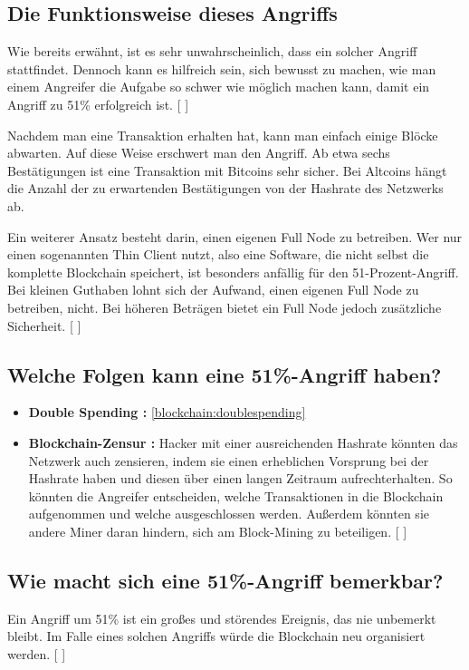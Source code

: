 \documentclass[ngerman]{scrreprt}
\begin{document}
\subsection{Die Funktionsweise dieses Angriffs}
Wie bereits erwähnt, ist es sehr unwahrscheinlich, dass ein solcher Angriff stattfindet. Dennoch kann es hilfreich sein, sich bewusst zu machen, wie man einem Angreifer die Aufgabe so schwer wie möglich machen kann, damit ein Angriff zu 51\% erfolgreich ist. [ \cite{51attack} ]

Nachdem man eine Transaktion erhalten hat, kann man einfach einige Blöcke abwarten. Auf diese Weise erschwert man den Angriff. Ab etwa sechs Bestätigungen ist eine Transaktion mit Bitcoins sehr sicher. Bei Altcoins hängt die Anzahl der zu erwartenden Bestätigungen von der Hashrate des Netzwerks ab.   

Ein weiterer Ansatz besteht darin, einen eigenen Full Node zu betreiben. Wer nur einen sogenannten Thin Client nutzt, also eine Software, die nicht selbst die komplette Blockchain speichert, ist besonders anfällig für den 51-Prozent-Angriff. Bei kleinen Guthaben lohnt sich der Aufwand, einen eigenen Full Node zu betreiben, nicht. Bei höheren Beträgen bietet ein Full Node jedoch zusätzliche Sicherheit. [ \cite{51attack} ]

\subsection{Welche Folgen kann eine 51\%-Angriff haben? }
\begin{itemize}
	\item \textbf{Double Spending : } \cref{blockchain:doublespending}
	\item \textbf{Blockchain-Zensur : } Hacker mit einer ausreichenden Hashrate könnten das Netzwerk auch zensieren, indem sie einen erheblichen Vorsprung bei der Hashrate haben und diesen über einen langen Zeitraum aufrechterhalten. So könnten die Angreifer entscheiden, welche Transaktionen in die Blockchain aufgenommen und welche ausgeschlossen werden. Außerdem könnten sie andere Miner daran hindern, sich am Block-Mining zu beteiligen. [ \cite{51attack} ]
\end{itemize}

\subsection{Wie macht sich eine 51\%-Angriff bemerkbar?}
Ein Angriff um 51\% ist ein großes und störendes Ereignis, das nie unbemerkt bleibt. Im Falle eines solchen Angriffs würde die Blockchain neu organisiert werden. [ \cite{51attack} ]
\end{document}
